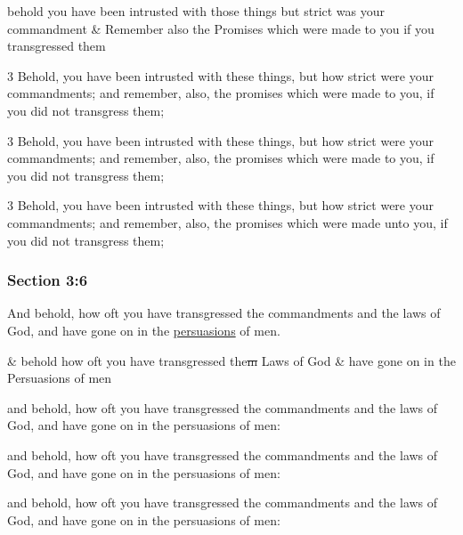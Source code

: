 		\begin{framed}
		\scriptsize
			\begin{compactdesc}
				\item[JSP] behold you have been intrusted with those things but strict was your commandment \& Remember also the Promises which were made to you if you transgressed them
				\item[BC] 3 Behold, you have been intrusted with these things, but how strict were your commandments; and remember, also, the promises which were made to you, if you did not transgress them;
				\item[DC 1835] 3 Behold, you have been intrusted with these things, but how strict were your commandments; and remember, also, the promises which were made to you, if you did not transgress them;
				\item[DC 1844] 3 Behold, you have been intrusted with these things, but how strict were your commandments; and remember, also, the promises which were made unto you, if you did not transgress them;
			\end{compactdesc}
		\end{framed}

	\subsubsection{Section 3:6} %
		\label{DC3-6}

		And behold, how oft you have transgressed the commandments and the laws of God, and have gone on in the \hyperref[PERSUASION]{persuasions} of men.

		\begin{framed}
		\scriptsize
			\begin{compactdesc}
				\item[JSP] \& behold how oft you have transgressed the\sout{m} Laws of God \& have gone on in the Persuasions of men
				\item[BC] and behold, how oft you have transgressed the commandments and the laws of God, and have gone on in the persuasions of men:
				\item[DC 1835] and behold, how oft you have transgressed the commandments and the laws of God, and have gone on in the persuasions of men:
				\item[DC 1844] and behold, how oft you have transgressed the commandments and the laws of God, and have gone on in the persuasions of men:
			\end{compactdesc}
		\end{framed}

